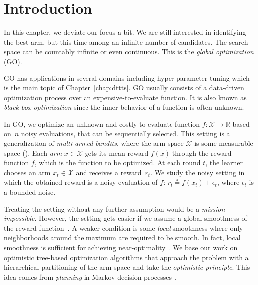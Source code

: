\section{Introduction}\label{sec:gpo.intro}

In this chapter, we deviate our focus a bit. We are still interested in identifying the best arm, but this time among an infinite number of candidates. The search space can be countably infinite or even continuous. This is the \emph{global optimization} (GO). 

GO has applications in several domains including hyper-parameter tuning \citep{jamieson2016hyperband, li2017hyperband,samothrakis2013} which is the main topic of Chapter~\ref{chap:dttts}. GO usually consists of a data-driven optimization process over an expensive-to-evaluate function. It is also known as \emph{black-box optimization} since the inner behavior of a function is often unknown.

In GO, we optimize an unknown and costly-to-evaluate function $f: \mathcal{X} \rightarrow \mathbb{R}$ based on~$n$ noisy evaluations, that can be sequentially selected. This setting is a generalization of \textit{multi-armed bandits}, where the arm space $\mathcal{X}$ is some measurable space (\citealt{bubeck2011pure}). Each \emph{arm} $x \in \mathcal{X}$ gets its mean reward $f(x)$ through the reward function $f$, which is  the function to be optimized. At each round $t$, the learner chooses an arm $x_t \in \mathcal{X}$ and receives a reward~$r_t$. We study the noisy setting in which the obtained reward is a noisy evaluation of $f$: $r_t \triangleq f(x_t) + \epsilon_t$, where $\epsilon_t$ is a bounded noise.

Treating the setting without any further assumption would be a \emph{mission impossible}. However, the setting gets easier if we assume a global smoothness of the reward function~\citep{agrawal1995continuum,kleinberg2004nearly,kleinberg2008multi,cope2009,auer2007improved,slivkins2011taxonomy,kleinberg2013}. A weaker condition is some \emph{local} smoothness where only neighborhoods around the maximum are required to be smooth.  In fact, local smoothness is sufficient for achieving near-optimality~\citep{valko2013stosoo,azar2014online,grill2015poo,bull2015adaptive}.
We base our work on optimistic tree-based optimization algorithms \citep{munos2011soo,valko2013stosoo,preux2014bandits,azar2014online} that approach the problem with a hierarchical partitioning of the arm space and take the \textit{optimistic principle}. This idea comes from \textit{planning} in Markov decision processes~\citep{kocsis2006bandit,munos2014,grill2016trail}.

